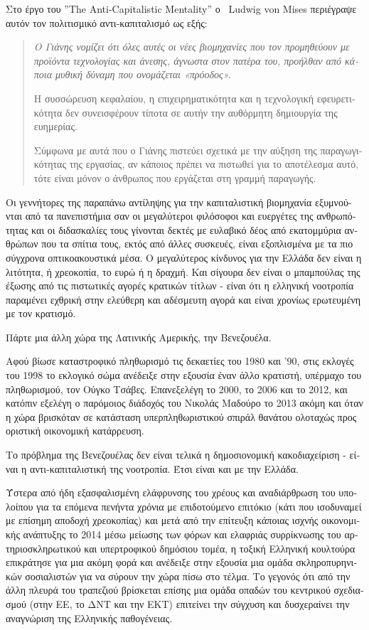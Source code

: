 \documentclass[11pt, twocolumn]{scrartcl}
\newenvironment{italicquotes}
{\begin{quote}\itshape}
{\end{quote}}
\begin{document}
\begin{otherlanguage}{greek}
Στο έργο του \latintext''The Anti-Capitalistic Mentality'' \greektext ο \latintext\ Ludwig von Mises \greektext περιέγραψε αυτόν τον πολιτισμικό αντι-καπιταλισμό ως εξής:
\begin{italicquotes}
Ο Γιάνης νομίζει ότι όλες αυτές οι νέες βιομηχανίες που τον προμηθεύουν με προϊόντα τεχνολογίας και άνεσης, άγνωστα στον πατέρα του, προήλθαν από κάποια μυθική δύναμη που ονομάζεται «πρόοδος».

Η συσσώρευση κεφαλαίου, η επιχειρηματικότητα και η τεχνολογική εφευρετικότητα δεν συνεισφέρουν τίποτα σε αυτήν την αυθόρμητη δημιουργία της ευημερίας.

Σύμφωνα με αυτά που ο Γιάνης πιστεύει σχετικά με την αύξηση της παραγωγικότητας της εργασίας, αν κάποιος πρέπει να πιστωθεί για το αποτέλεσμα αυτό, τότε είναι μόνον ο άνθρωπος που εργάζεται στη γραμμή παραγωγής.
\end{italicquotes}

Οι γεννήτορες της παραπάνω αντίληψης για την καπιταλιστική βιομηχανία εξυμνούνται από τα πανεπιστήμια σαν οι μεγαλύτεροι φιλόσοφοι και ευεργέτες της ανθρωπότητας και οι διδασκαλίες τους γίνονται δεκτές με ευλαβικό δέος από εκατομμύρια ανθρώπων που τα σπίτια τους, εκτός από άλλες συσκευές, είναι εξοπλισμένα με τα πιο σύγχρονα οπτικοακουστικά μέσα.
Ο μεγαλύτερος κίνδυνος για την Ελλάδα δεν είναι η λιτότητα, ή χρεοκοπία, το ευρώ ή η δραχμή. Και σίγουρα δεν είναι ο μπαμπούλας της έξωσης από τις πιστωτικές αγορές κρατικών τίτλων - είναι ότι η ελληνική νοοτροπία παραμένει εχθρική στην ελεύθερη και αδέσμευτη αγορά και είναι χρονίως ερωτευμένη με τον κρατισμό.

Πάρτε μια άλλη χώρα της Λατινικής Αμερικής, την  Βενεζουέλα.

Αφού βίωσε καταστροφικό πληθωρισμό τις δεκαετίες του 1980 και '90, στις εκλογές του 1998 το εκλογικό σώμα ανέδειξε στην εξουσία έναν άλλο κρατιστή, υπέρμαχο του πληθωρισμού, τον Ούγκο Τσάβες. Επανεξελέγη το 2000, το 2006 και το 2012, και κατόπιν εξελέγη ο παρόμοιος διάδοχός του Νικολάς Μαδούρο το 2013 ακόμη και όταν η χώρα βρισκόταν σε κατάσταση υπερπληθωριστικού σπιράλ θανάτου ολοταχώς προς οριστική οικονομική κατάρρευση.

Το πρόβλημα της Βενεζουέλας δεν είναι τελικά η δημοσιονομική κακοδιαχείριση - είναι η αντι-καπιταλιστική της νοοτροπία.
Έτσι είναι και με την Ελλάδα.

Ύστερα από ήδη εξασφαλισμένη ελάφρυνσης του χρέους και αναδιάρθρωση του υπολοίπου για τα επόμενα πενήντα χρόνια με επιδοτούμενο επιτόκιο (κάτι που ισοδυναμεί με επίσημη αποδοχή χρεοκοπίας) και μετά από την επίτευξη κάποιας ισχνής οικονομικής ανάπτυξης το 2014 μέσω μείωσης των φόρων και ελαφριάς συρρίκνωσης του  αρτηριοσκληρωτικού και υπερτροφικού δημόσιου τομέα, η τοξική Ελληνική κουλτούρα επικράτησε για μια ακόμη φορά και ανέδειξε στην εξουσία μια ομάδα σκληροπυρηνικών σοσιαλιστών για να σύρουν την χώρα πίσω στο τέλμα.
Το γεγονός ότι από την άλλη πλευρά του τραπεζιού βρίσκεται επίσης μια ομάδα οπαδών του κεντρικού σχεδιασμού (στην ΕΕ, το ΔΝΤ και την ΕΚΤ) επιτείνει την σύγχυση και δυσχεραίνει την αναγνώριση της Ελληνικής παθογένειας.


\end{otherlanguage}
\end{document}
